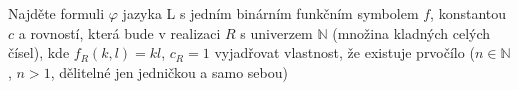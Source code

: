 Najděte formuli $\varphi$ jazyka L s jedním binárním funkčním symbolem $f$,
konstantou $c$ a rovností, která bude v realizaci $R$ s univerzem $\mathbb{N}$
(množina kladných celých čísel), kde $f_{R}(k,l)=kl$, $c_{R}=1$ vyjadřovat
vlastnost, že existuje prvočílo ($n \in \mathbb{N}$, $n > 1$, dělitelné jen
jedničkou a samo sebou)
